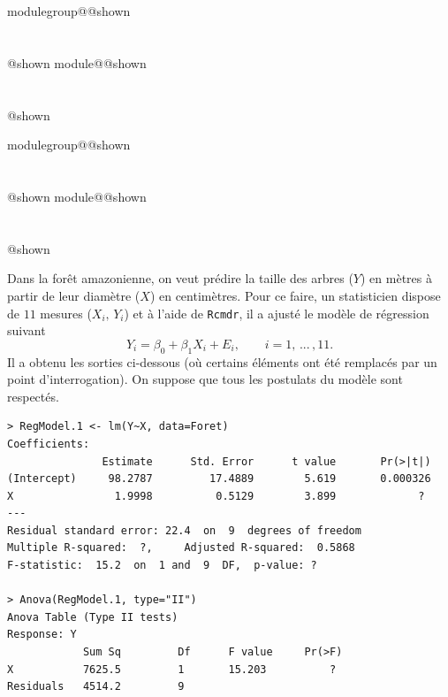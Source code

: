 \documentclass{Evaluation}
\makeatletter
\newcommand{\currentmodulekey}{}
\newcommand{\currentmoduletitle}{}
\newcommand{\currentgroupkey}{}
\newcommand{\currentgrouptitle}{}
\newcommand{\showmoduleifneeded}{%
  \ifx\currentgroupkey\empty\else
    \expandafter\ifx\csname modulegroup@\currentgroupkey @shown\endcsname\relax
      \section*{\currentgrouptitle}%
      \expandafter\gdef\csname modulegroup@\currentgroupkey @shown\endcsname{1}%
    \fi
  \fi
  \expandafter\ifx\csname module@\currentmodulekey @shown\endcsname\relax
    \section*{\currentmoduletitle}%
    \expandafter\gdef\csname module@\currentmodulekey @shown\endcsname{1}%
  \fi
}
\newenvironment{A22}{\showmoduleifneeded}{}
\newenvironment{A24}{\showmoduleifneeded}{}
\makeatother
\begin{document}
\begin{questions}
\begin{A24}
\end{A24}

\begin{A22}
\question {} %
Dans la forêt amazonienne, on veut prédire la taille des arbres ($Y$) en mètres à partir de leur diamètre ($X$) en centimètres. Pour ce faire, un statisticien dispose de $11$ mesures ($X_i,\,Y_i$) et à l'aide de \texttt{Rcmdr}, il a ajusté le modèle de régression suivant
$$Y_i=\beta_0+\beta_1X_i+E_i,\qquad i=1,\,...\,,11.$$
Il a obtenu les sorties ci-dessous (où certains éléments ont été remplacés par un point d'interrogation). On suppose que tous les postulats du modèle sont respectés.

\begin{verbatim}
> RegModel.1 <- lm(Y~X, data=Foret)
Coefficients:
               Estimate      Std. Error      t value       Pr(>|t|)
(Intercept)     98.2787         17.4889        5.619       0.000326
X                1.9998          0.5129        3.899             ?
---
Residual standard error: 22.4  on  9  degrees of freedom
Multiple R-squared:  ?, 	Adjusted R-squared:  0.5868
F-statistic:  15.2  on  1 and  9  DF,  p-value: ?

> Anova(RegModel.1, type="II")
Anova Table (Type II tests)
Response: Y
            Sum Sq         Df      F value     Pr(>F)
X           7625.5         1       15.203          ?
Residuals   4514.2         9
\end{verbatim}

\end{A22}
\end{questions}
\end{document}
